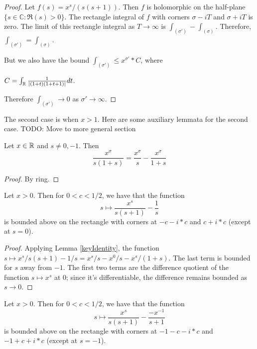 \begin{proof}\leanok
{}
  Let $f(s) = x^s/(s(s+1))$. Then $f$ is holomorphic on the half-plane $\{s\in\mathbb{C}:\Re(s)>0\}$.
  The rectangle integral of $f$ with corners $\sigma-iT$ and $\sigma+iT$ is zero.
  The limit of this rectangle integral as $T\to\infty$ is $\int_{(\sigma')}-\int_{(\sigma)}$.
  Therefore, $\int_{(\sigma')}=\int_{(\sigma)}$.

 But we also have the bound $\int_{(\sigma')} \leq x^{\sigma'} * C$, where

 $C=\int_\R\frac{1}{|(1+t)(1+t+1)|}dt$.

 Therefore $\int_{(\sigma')}\to 0$ as $\sigma'\to\infty$.

\end{proof}


The second case is when $x>1$.
Here are some auxiliary lemmata for the second case.
TODO: Move to more general section


\begin{lemma}[keyIdentity]\label{keyIdentity}\leanok
Let $x\in \R$ and $s \ne 0, -1$. Then
$$
\frac{x^\sigma}{s(1+s)} = \frac{x^\sigma}{s} - \frac{x^\sigma}{1+s}
$$
\end{lemma}


\begin{proof}\leanok
By ring.
\end{proof}


\begin{lemma}[diffBddAtZero]\label{diffBddAtZero}\leanok
Let $x>0$. Then for $0 < c < 1 /2$, we have that the function
$$
s ↦ \frac{x^s}{s(s+1)} - \frac1s
$$
is bounded above on the rectangle with corners at $-c-i*c$ and $c+i*c$ (except at $s=0$).
\end{lemma}


\begin{proof}\leanok
Applying Lemma \ref{keyIdentity}, the
 function $s ↦ x^s/s(s+1) - 1/s = x^s/s - x^0/s - x^s/(1+s)$. The last term is bounded for $s$
 away from $-1$. The first two terms are the difference quotient of the function $s ↦ x^s$ at
 $0$; since it's differentiable, the difference remains bounded as $s\to 0$.
\end{proof}


\begin{lemma}[diffBddAtNegOne]\label{diffBddAtNegOne}\leanok
Let $x>0$. Then for $0 < c < 1 /2$, we have that the function
$$
s ↦ \frac{x^s}{s(s+1)} - \frac{-x^{-1}}{s+1}
$$
is bounded above on the rectangle with corners at $-1-c-i*c$ and $-1+c+i*c$ (except at $s=-1$).
\end{lemma}


